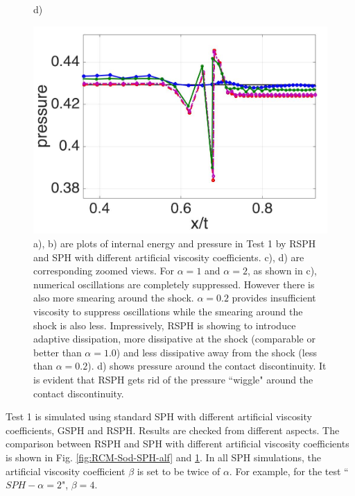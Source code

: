 \documentclass[preprint,12pt,authoryear]{elsarticle}
\begin{document}
\begin{figure}[H]
\begin{minipage}{.45 \textwidth}
    \end{minipage}%
    \begin{minipage}{.545\textwidth}
    \centering d)
        \begin{flushleft}
        \includegraphics[width= 0.8174 \textwidth, height=0.5780 \textwidth]{./Figures/RCM-Sod-SPH-alf-p-zoom}    
        \end{flushleft}
    \end{minipage}%
    \caption{
    a), b) are plots of internal energy and pressure in Test 1 by RSPH and SPH with different artificial viscosity coefficients.  c), d) are corresponding zoomed views. For $\alpha=1$ and $\alpha=2$, as shown in c), numerical oscillations are completely suppressed. However there is also more smearing around the shock. $\alpha=0.2$ provides insufficient viscosity to suppress oscillations while the smearing around the shock is also less. Impressively, RSPH is showing to introduce adaptive dissipation, more dissipative at the shock (comparable or better than $\alpha=1.0$) and less dissipative away from the shock (less than $\alpha=0.2$). d) shows pressure around the contact discontinuity. It is evident that RSPH gets rid of the pressure ``wiggle" around the contact discontinuity.}
    \label{fig:RCM-Sod-SPH-alf-zoom}
\end{figure}

Test 1 is simulated using standard SPH with different artificial viscosity coefficients, GSPH and RSPH. Results are checked from different aspects.  
The comparison between RSPH and SPH with different artificial viscosity coefficients is shown in Fig. \ref{fig:RCM-Sod-SPH-alf} and \ref{fig:RCM-Sod-SPH-alf-zoom}. In all SPH simulations, the artificial viscosity coefficient $\beta$ is set to be twice of $\alpha$. For example, for the test ``$SPH-\alpha=2$", $\beta=4$.
\end{document}
